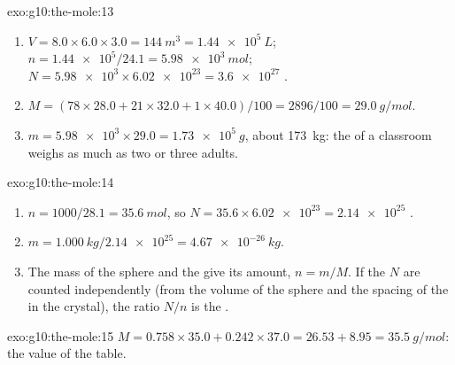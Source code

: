 \begin{solution}{exo:g10:the-mole:13}
\begin{enumerate}
  \item $V = 8.0 \times 6.0 \times 3.0 = \qty{144}{m^3} =
        \qty{1.44e5}{L}$; $n = \num{1.44e5} / 24.1 = \qty{5.98e3}{mol}$;
        $N = \num{5.98e3} \times \num{6.02e23} = \num{3.6e27}$ .
  \item $M = (78 \times 28.0 + 21 \times 32.0 + 1 \times 40.0) / 100 =
        2896 / 100 = \qty{29.0}{g/mol}$.
  \item $m = \num{5.98e3} \times 29.0 = \qty{1.73e5}{g}$, about
        \qty{173}{kg}: the  of a classroom weighs as much as two or
        three adults.
\end{enumerate}
\end{solution}

\begin{solution}{exo:g10:the-mole:14}
\begin{enumerate}
  \item $n = 1000 / 28.1 = \qty{35.6}{mol}$, so
        $N = 35.6 \times \num{6.02e23} = \num{2.14e25}$ .
  \item $m = \qty{1.000}{kg} / \num{2.14e25} = \qty{4.67e-26}{kg}$.
  \item The mass of the sphere and the  give its amount,
        $n = m / M$. If the  $N$ are counted independently (from
        the volume of the sphere and the spacing of the  in the
        crystal), the ratio $N / n$ is the .
\end{enumerate}
\end{solution}

\begin{solution}{exo:g10:the-mole:15}
$M = 0.758 \times 35.0 + 0.242 \times 37.0 = 26.53 + 8.95 =
\qty{35.5}{g/mol}$: the value of the table.
\end{solution}

